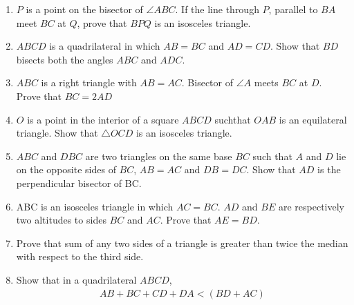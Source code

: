 \documentclass {article}
\begin{document}
\begin {enumerate}
[\textcolor{cyan}{Hint:} Recall how $\angle B = \angle C $ is proved when $AB = AC$].
\begin{center}
\texttt{[image: 7B]}
\end{center}
\item $P$ is a point on the bisector of $\angle ABC$. If the line through $P$, parallel to $BA$ meet $BC$ at $Q$, prove that $BPQ$ is an isosceles triangle.
\item $ABCD$ is a quadrilateral in which $AB = BC$ and $AD = CD$. Show that $BD$ bisects both the angles $ABC$ and $ADC$.
\item $ABC$ is a right triangle with $AB = AC$. Bisector of $\angle A$ meets $BC$ at $D$. Prove that $BC = 2 AD$
\item $O$ is a point in the interior of a square $ABCD$ suchthat $OAB$ is an equilateral triangle. Show that $\triangle  OCD$ is an isosceles triangle.
\item $ABC$ and $DBC$ are two triangles on the same base $BC$ such that $A$ and $D$ lie on the opposite sides of $BC$, $AB = AC$ and $DB = DC$. Show that $AD$ is the perpendicular bisector of BC.
\item ABC is an isosceles triangle in which $AC = BC$. $AD$ and $BE$ are respectively two altitudes to sides $BC$ and $AC$. Prove that $AE = BD$.
\item Prove that sum of any two sides of a triangle is greater than twice the median with respect to the third side.
\item Show that in a quadrilateral $ABCD$, 
\begin{align*}
     AB + BC + CD + DA  <  (BD + AC)
\end{align*}	


\end{enumerate}
\end{document}
